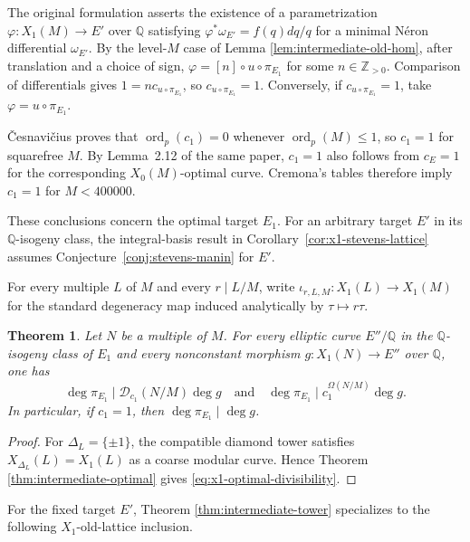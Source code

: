 \documentclass[12pt, letterpaper]{amsart}
\newtheorem{theorem}{Theorem}[section]
\theoremstyle{definition}
\theoremstyle{remark}
\newcommand{\Q}{\mathbb Q}
\newcommand{\Z}{\mathbb Z}
\DeclareMathOperator{\ord}{ord}
\numberwithin{equation}{section}
\begin{document}
The original formulation asserts the existence of a parametrization
\(\varphi:X_1(M)\to E'\) over \(\Q\) satisfying
\(\varphi^*\omega_{E'}=f(q)dq/q\) for a minimal N\'eron differential
\(\omega_{E'}\). By the level-\(M\) case of Lemma
\ref{lem:intermediate-old-hom}, after translation and a choice of sign,
\(\varphi=[n]\circ u\circ\pi_{E_1}\) for some \(n\in\Z_{>0}\).
Comparison of differentials gives \(1=n c_{u\circ\pi_{E_1}}\), so
\(c_{u\circ\pi_{E_1}}=1\). Conversely, if \(c_{u\circ\pi_{E_1}}=1\), take
\(\varphi=u\circ\pi_{E_1}\).

\v{C}esnavi\v{c}ius \cite{CesnaviciusManinSemistable} proves that
\(\ord_p(c_1)=0\) whenever \(\ord_p(M)\le 1\), so \(c_1=1\) for squarefree
\(M\). By Lemma~2.12 of the same paper, \(c_1=1\) also follows from
\(c_E=1\) for the corresponding \(X_0(M)\)-optimal curve. Cremona's tables
\cite{AgasheRibetStein,CremonaData} therefore imply \(c_1=1\) for
\(M<400000\).

These conclusions concern the optimal target \(E_1\). For an arbitrary
target \(E'\) in its \(\Q\)-isogeny class, the integral-basis result in
Corollary~\ref{cor:x1-stevens-lattice} assumes
Conjecture~\ref{conj:stevens-manin} for \(E'\).

For every multiple \(L\) of \(M\) and every \(r\mid L/M\), write
\(\iota_{r,L,M}:X_1(L)\to X_1(M)\) for the standard degeneracy map
induced analytically by \(\tau\mapsto r\tau\).

\begin{theorem}\label{thm:x1-final}
Let \(N\) be a multiple of \(M\). For every
elliptic curve \(E''/\Q\) in the \(\Q\)-isogeny class of \(E_1\) and every
nonconstant morphism \(g:X_1(N)\to E''\) over \(\Q\), one has
\begin{equation}\label{eq:x1-optimal-divisibility}
        \deg\pi_{E_1}\mid\mathcal D_{c_1}(N/M)\deg g
        \quad\text{and}\quad
        \deg\pi_{E_1}\mid c_1^{\Omega(N/M)}\deg g.
\end{equation}
In particular, if \(c_1=1\), then \(\deg\pi_{E_1}\mid\deg g\).
\end{theorem}

\begin{proof}
For \(\Delta_L=\{\pm1\}\), the compatible diamond tower satisfies
\(X_{\Delta_L}(L)=X_1(L)\) as a coarse modular curve. Hence Theorem
\ref{thm:intermediate-optimal} gives
\eqref{eq:x1-optimal-divisibility}.
\end{proof}

For the fixed target \(E'\), Theorem
\ref{thm:intermediate-tower} specializes to the following \(X_1\)-old-lattice
inclusion.
\end{document}
